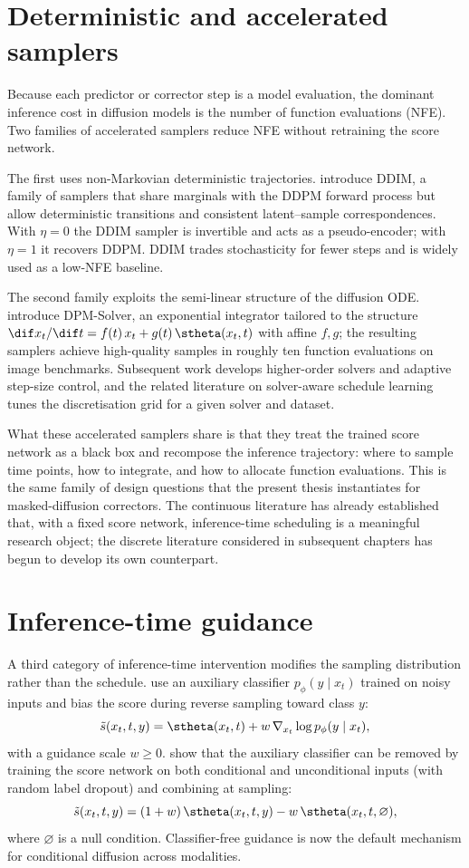 \section{Deterministic and accelerated samplers}
\label{lit:sec:fast-samplers}

Because each predictor or corrector step is a model evaluation, the dominant
inference cost in diffusion models is the number of function evaluations
(NFE). Two families of accelerated samplers reduce NFE without retraining
the score network.

The first uses non-Markovian deterministic trajectories.
\textcite{song2020ddim} introduce DDIM, a family of samplers that share
marginals with the DDPM forward process but allow deterministic transitions
and consistent latent--sample correspondences. With $\eta=0$ the DDIM
sampler is invertible and acts as a pseudo-encoder; with $\eta=1$ it
recovers DDPM. DDIM trades stochasticity for fewer steps and is widely used
as a low-NFE baseline.

The second family exploits the semi-linear structure of the diffusion ODE.
\textcite{lu2022dpmsolver} introduce DPM-Solver, an exponential integrator
tailored to the structure
$\dif x_t/\dif t = f(t)\,x_t + g(t)\,\stheta(x_t,t)$ with affine $f,g$;
the resulting samplers achieve high-quality samples in roughly ten function
evaluations on image benchmarks. Subsequent work develops higher-order
solvers and adaptive step-size control, and the related literature on
solver-aware schedule learning tunes the discretisation grid for a given
solver and dataset.

What these accelerated samplers share is that they treat the trained score
network as a black box and recompose the inference trajectory: where to
sample time points, how to integrate, and how to allocate function
evaluations. This is the same family of design questions that the present
thesis instantiates for masked-diffusion correctors. The continuous
literature has already established that, with a fixed score network,
inference-time scheduling is a meaningful research object; the discrete
literature considered in subsequent chapters has begun to develop its own
counterpart.

\section{Inference-time guidance}
\label{lit:sec:guidance}

A third category of inference-time intervention modifies the sampling
distribution rather than the schedule. \textcite{dhariwal2021diffusionbeats}
use an auxiliary classifier $p_\phi(y\mid x_t)$ trained on noisy inputs and
bias the score during reverse sampling toward class $y$:
\[
  \tilde s(x_t,t,y)
  = \stheta(x_t,t) + w\,\nabla_{x_t}\log p_\phi(y\mid x_t),
\]
with a guidance scale $w\geq 0$. \textcite{ho2022cfg} show that the
auxiliary classifier can be removed by training the score network on both
conditional and unconditional inputs (with random label dropout) and
combining at sampling:
\[
  \tilde s(x_t,t,y)
  = (1+w)\,\stheta(x_t,t,y) - w\,\stheta(x_t,t,\varnothing),
\]
where $\varnothing$ is a null condition. Classifier-free guidance is now the
default mechanism for conditional diffusion across modalities.

